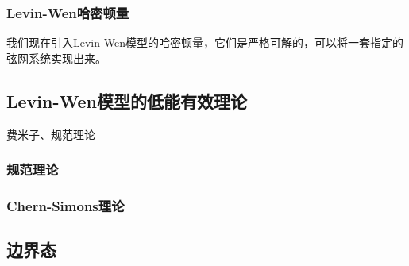 \subsubsection{Levin-Wen哈密顿量}

我们现在引入Levin-Wen模型的哈密顿量，它们是严格可解的，可以将一套指定的弦网系统实现出来。

\subsection{Levin-Wen模型的低能有效理论}

费米子、规范理论

\subsubsection{规范理论}

\subsubsection{Chern-Simons理论}

\subsection{边界态}

